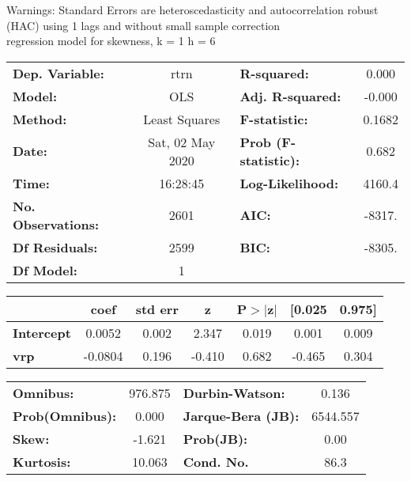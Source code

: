 Warnings: \newline
 [1] Standard Errors are heteroscedasticity and autocorrelation robust (HAC) using 1 lags and without small sample correction\\ 

regression model for skewness, k = 1 h = 6\begin{center}
\begin{tabular}{lclc}
\toprule
\textbf{Dep. Variable:}    &       rtrn       & \textbf{  R-squared:         } &     0.000   \\
\textbf{Model:}            &       OLS        & \textbf{  Adj. R-squared:    } &    -0.000   \\
\textbf{Method:}           &  Least Squares   & \textbf{  F-statistic:       } &    0.1682   \\
\textbf{Date:}             & Sat, 02 May 2020 & \textbf{  Prob (F-statistic):} &    0.682    \\
\textbf{Time:}             &     16:28:45     & \textbf{  Log-Likelihood:    } &    4160.4   \\
\textbf{No. Observations:} &        2601      & \textbf{  AIC:               } &    -8317.   \\
\textbf{Df Residuals:}     &        2599      & \textbf{  BIC:               } &    -8305.   \\
\textbf{Df Model:}         &           1      & \textbf{                     } &             \\
\bottomrule
\end{tabular}
\begin{tabular}{lcccccc}
                   & \textbf{coef} & \textbf{std err} & \textbf{z} & \textbf{P$> |$z$|$} & \textbf{[0.025} & \textbf{0.975]}  \\
\midrule
\textbf{Intercept} &       0.0052  &        0.002     &     2.347  &         0.019        &        0.001    &        0.009     \\
\textbf{vrp}       &      -0.0804  &        0.196     &    -0.410  &         0.682        &       -0.465    &        0.304     \\
\bottomrule
\end{tabular}
\begin{tabular}{lclc}
\textbf{Omnibus:}       & 976.875 & \textbf{  Durbin-Watson:     } &    0.136  \\
\textbf{Prob(Omnibus):} &   0.000 & \textbf{  Jarque-Bera (JB):  } & 6544.557  \\
\textbf{Skew:}          &  -1.621 & \textbf{  Prob(JB):          } &     0.00  \\
\textbf{Kurtosis:}      &  10.063 & \textbf{  Cond. No.          } &     86.3  \\
\bottomrule
\end{tabular}
\end{center}

